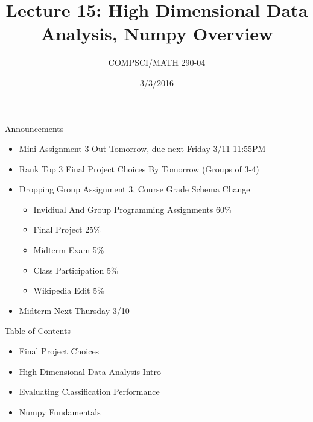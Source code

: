\documentclass{beamer}
\title{Lecture 15: High Dimensional Data Analysis, Numpy Overview}
\date{3/3/2016}
\institute{Chris Tralie, Duke University}
\author{COMPSCI/MATH 290-04}
\begin{document}
\frame{\titlepage}

\begin{frame}{Announcements}
\begin{itemize}[label=$\vartriangleright$]

\item Mini Assignment 3 Out Tomorrow, due next Friday 3/11 11:55PM

\item Rank Top 3 Final Project Choices By Tomorrow (Groups of 3-4)

\item Dropping Group Assignment 3, Course Grade Schema Change
\begin{itemize}
\item Invidiual And Group Programming Assignments	60\%
\item Final Project	25\%
\item Midterm Exam	5\%
\item Class Participation	5\%
\item Wikipedia Edit	5\%
\end{itemize}

\item Midterm Next Thursday 3/10

\end{itemize}

\end{frame}

\begin{frame}{Table of Contents}
\begin{itemize}[label=$\blacktriangleright$]
	\item Final Project Choices
\end{itemize}
\begin{itemize}[label=$\vartriangleright$]
	\item High Dimensional Data Analysis Intro
\end{itemize}
\begin{itemize}[label=$\vartriangleright$]
	\item Evaluating Classification Performance
\end{itemize}
\begin{itemize}[label=$\vartriangleright$]
	\item Numpy Fundamentals
\end{itemize}
\end{frame}
\end{document}
